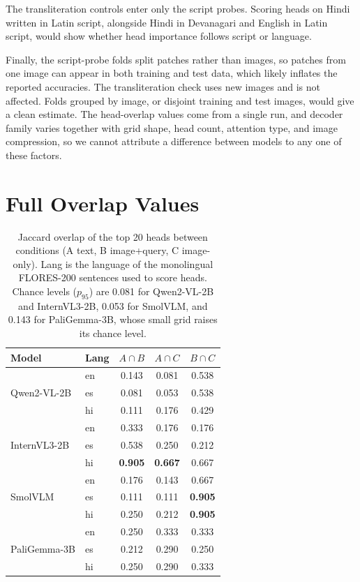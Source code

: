\documentclass[10pt]{article}
\newcommand{\AcapB}{A{\cap}B}
\newcommand{\AcapC}{A{\cap}C}
\newcommand{\BcapC}{B{\cap}C}
\begin{document}
The transliteration controls enter only the script probes. Scoring heads on Hindi written in Latin script, alongside Hindi in Devanagari and English in Latin script, would show whether head importance follows script or language.

Finally, the script-probe folds split patches rather than images, so patches from one image can appear in both training and test data, which likely inflates the reported accuracies. The transliteration check uses new images and is not affected. Folds grouped by image, or disjoint training and test images, would give a clean estimate. The head-overlap values come from a single run, and decoder family varies together with grid shape, head count, attention type, and image compression, so we cannot attribute a difference between models to any one of these factors.




\clearpage
\appendix

\section{Full Overlap Values}
\label{app:overlap}

\begin{table}[H]
\centering
\caption{Jaccard overlap of the top 20 heads between conditions (A text, B image+query, C image-only). Lang is the language of the monolingual FLORES-200 sentences used to score heads. Chance levels ($p_{95}$) are 0.081 for Qwen2-VL-2B and InternVL3-2B, 0.053 for SmolVLM, and 0.143 for PaliGemma-3B, whose small grid raises its chance level.}
\label{tab:overlap}
\begin{tabular}{ll ccc}
\toprule
Model & Lang & $\AcapB$ & $\AcapC$ & $\BcapC$ \\
\midrule
\multirow{3}{*}{Qwen2-VL-2B}
  & en & 0.143 & 0.081 & 0.538 \\
  & es & 0.081 & 0.053 & 0.538 \\
  & hi & 0.111 & 0.176 & 0.429 \\
\midrule
\multirow{3}{*}{InternVL3-2B}
  & en & 0.333 & 0.176 & 0.176 \\
  & es & 0.538 & 0.250 & 0.212 \\
  & hi & \textbf{0.905} & \textbf{0.667} & 0.667 \\
\midrule
\multirow{3}{*}{SmolVLM}
  & en & 0.176 & 0.143 & 0.667 \\
  & es & 0.111 & 0.111 & \textbf{0.905} \\
  & hi & 0.250 & 0.212 & \textbf{0.905} \\
\midrule
\multirow{3}{*}{PaliGemma-3B}
  & en & 0.250 & 0.333 & 0.333 \\
  & es & 0.212 & 0.290 & 0.250 \\
  & hi & 0.250 & 0.290 & 0.333 \\
\bottomrule
\end{tabular}
\end{table}
\end{document}
